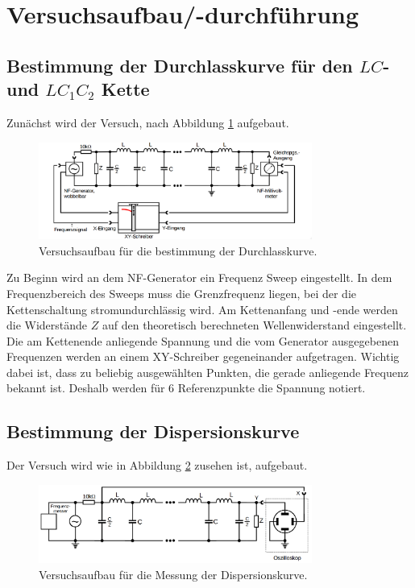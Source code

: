 \section{Versuchsaufbau/-durchführung}

\subsection{Bestimmung der Durchlasskurve für den $LC$- und $LC_1 C_2$ Kette}
Zunächst wird der Versuch, nach Abbildung \ref{fig:aufbau_durchlass} aufgebaut. %
\begin{figure}
  \centering
  \includegraphics[width=0.8\textwidth]{bilder/versuchsaufbau_1.png}
  \caption{Versuchsaufbau für die bestimmung der Durchlasskurve.\cite{anleitung356}}
  \label{fig:aufbau_durchlass}
\end{figure}

Zu Beginn wird an dem NF-Generator ein Frequenz Sweep eingestellt.
In dem Frequenzbereich des Sweeps muss die Grenzfrequenz liegen, bei der die
Kettenschaltung stromundurchlässig wird. %
Am Kettenanfang und -ende werden die Widerstände $Z$ auf den theoretisch
berechneten Wellenwiderstand eingestellt.
Die am Kettenende anliegende Spannung und die vom Generator ausgegebenen Frequenzen
werden an einem XY-Schreiber gegeneinander aufgetragen.
Wichtig dabei ist, dass zu beliebig ausgewählten Punkten, die gerade anliegende Frequenz bekannt ist.
Deshalb werden für 6 Referenzpunkte die Spannung notiert.  %


\subsection{Bestimmung der Dispersionskurve}
Der Versuch wird wie in Abbildung \ref{fig:aufbau_dispersion} zusehen ist, aufgebaut.%
\begin{figure}
  \centering
  \includegraphics[width=0.8\textwidth]{bilder/versuchsaufbau_dispersion.png}
  \caption{Versuchsaufbau für die Messung der Dispersionskurve.\cite{anleitung356}}
  \label{fig:aufbau_dispersion}
\end{figure}

